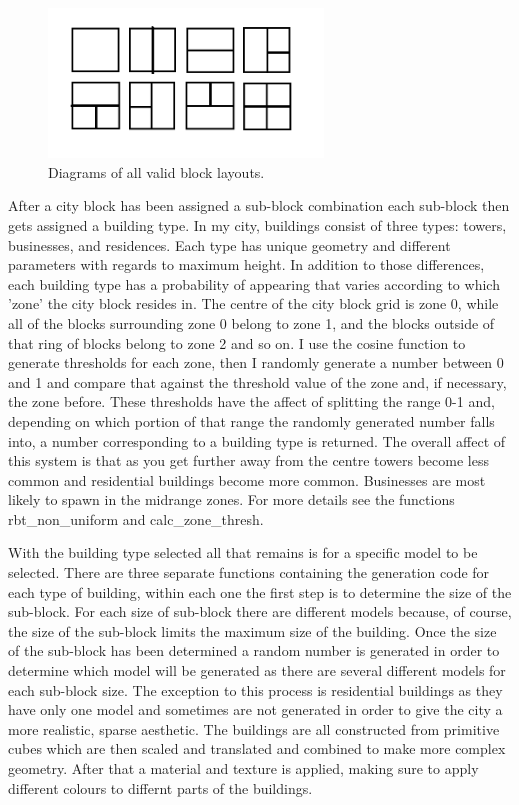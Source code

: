 \documentclass{article}
\begin{document}
\begin{figure}[H]
\begin{center}
\includegraphics[width=0.65\textwidth]{Block_types} %
\caption{Diagrams of all valid block layouts.}
\end{center}
\end{figure}

After a city block has been assigned a sub-block combination each sub-block then gets assigned a building type. In my city, buildings consist of three types: towers, businesses, and residences. Each type has unique geometry and different parameters with regards to maximum height. In addition to those differences, each building type has a probability of appearing that varies according to which 'zone' the city block resides in. The centre of the city block grid is zone 0, while all of the blocks surrounding zone 0 belong to zone 1, and the blocks outside of that ring of blocks belong to zone 2 and so on. I use the cosine function to generate thresholds for each zone, then I randomly generate a number between 0 and 1 and compare that against the threshold value of the zone and, if necessary, the zone before. These thresholds have the affect of splitting the range 0-1 and, depending on which portion of that range the randomly generated number falls into, a number corresponding to a building type is returned. The overall affect of this system is that as you get further away from the centre towers become less common and residential buildings become more common. Businesses are most likely to spawn in the midrange zones. For more details see the functions rbt\_non\_uniform and calc\_zone\_thresh. \par

With the building type selected all that remains is for a specific model to be selected. There are three separate functions containing the generation code for each type of building, within each one the first step is to determine the size of the sub-block. For each size of sub-block there are different models because, of course, the size of the sub-block limits the maximum size of the building. Once the size of the sub-block has been determined a random number is generated in order to determine which model will be generated as there are several different models for each sub-block size. The exception to this process is residential buildings as they have only one model and sometimes are not generated in order to give the city a more realistic, sparse aesthetic. The buildings are all constructed from primitive cubes which are then scaled and translated and combined to make more complex geometry. After that a material and texture is applied, making sure to apply different colours to differnt parts of the buildings.
\end{document}
